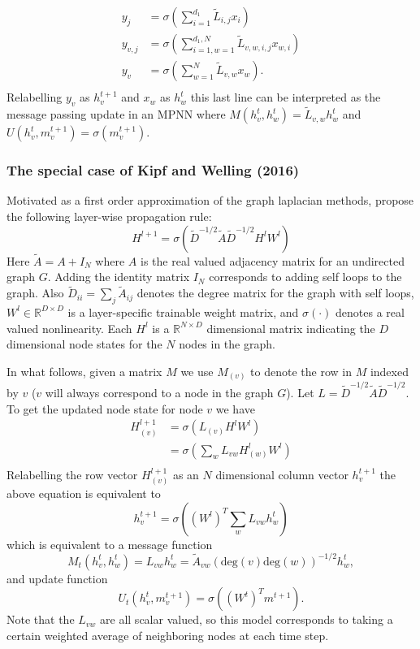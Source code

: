 \documentclass{article}
\begin{document}
    \begin{align*} 
        y_j & = \sigma \left( \sum\limits_{i=1}^{d_1} \tilde{L}_{i,j} x_i \right) \\
        y_{v,j} & = \sigma \left( \sum\limits_{i=1,w=1}^{d_1,N} \tilde{L}_{v,w,i,j} x_{w,i}\right) \\
        y_{v} & = \sigma \left( \sum\limits_{w=1}^{N} \tilde{L}_{v,w} x_{w} \right). \\
    \end{align*}
    Relabelling $y_v$ as $h_v^{t+1}$ and $x_w$ as $h_w^t$ this last line can be interpreted as the message passing update in an MPNN where $M(h_v^t, h_w^t) = \tilde{L}_{v,w} h_w^t$ and $U(h^t_v, m^{t+1}_v) = \sigma(m^{t+1}_v)$. 
    
    \subsubsection{The special case of Kipf and Welling (2016)}
    
    Motivated as a first order approximation of the graph laplacian methods, \citet{kipf2016} propose the following layer-wise propagation rule:
    \begin{equation}
        H^{l+1} = \sigma \left(\tilde{D}^{-1/2} \tilde{A} \tilde{D}^{-1/2} H^l W^l\right)
    \end{equation}
    Here $\tilde{A} = A + I_N$ where $A$ is the real valued adjacency matrix for an undirected graph $G$. Adding the identity matrix $I_N$ corresponds to adding self loops to the graph. Also $\tilde{D}_{ii} = \sum_j \tilde{A}_{ij}$ denotes the degree matrix for the graph with self loops, $W^{l} \in \mathbb{R}^{D \times D}$ is a layer-specific trainable weight matrix, and $\sigma(\cdot)$ denotes a real valued nonlinearity. Each $H^{l}$ is a $\mathbb{R}^{N \times D}$ dimensional matrix indicating the $D$ dimensional node states for the $N$ nodes in the graph. 
    
    In what follows, given a matrix $M$ we use $M_{(v)}$ to denote the row in $M$ indexed by $v$ ($v$ will always correspond to a node in the graph $G$). Let $L = \tilde{D}^{-1/2} \tilde{A} \tilde{D}^{-1/2}$. To get the updated node state for node $v$ we have 
    \begin{align*}
        H^{l+1}_{(v)} & = \sigma\left( L_{(v)} H^l W^l\right) \\
        & = \sigma\left( \sum\limits_{w} L_{vw} H^{l}_{(w)} W^{l} \right) \\
    \end{align*}
    Relabelling the row vector $H^{l+1}_{(v)}$ as an $N$ dimensional column vector $h_v^{t+1}$ the above equation is equivalent to
    \begin{equation}
        h^{t+1}_v = \sigma\left((W^{l})^T \sum\limits_{w} L_{vw} h_w^{t} \right)
    \end{equation}
    which is equivalent to a message function 
    \[ M_t(h^t_v, h^t_w) = L_{vw} h_w^{t} = \tilde{A}_{vw} (\textrm{deg}(v) \textrm{deg}(w))^{-1/2} h^t_w, \]
    and update function 
    \[U_t(h^t_v, m^{t+1}_v) = \sigma((W^{t})^T m^{t+1}).\]
    Note that the $L_{vw}$ are all scalar valued, so this model corresponds to taking a certain weighted average of neighboring nodes at each time step. 
    
\end{document}
